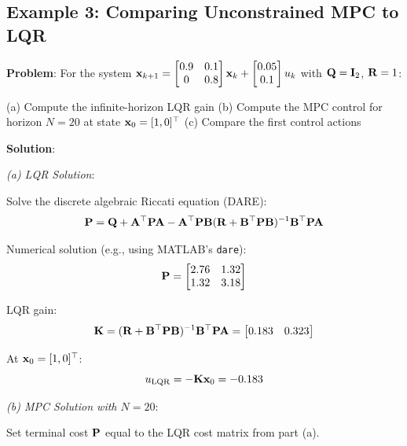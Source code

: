 \subsection{Example 3: Comparing Unconstrained MPC to LQR}

\textbf{Problem}: For the system $\mathbf{x}_{k+1} = \begin{bmatrix} 0.9 & 0.1 \\ 0 & 0.8 \end{bmatrix} \mathbf{x}_k + \begin{bmatrix} 0.05 \\ 0.1 \end{bmatrix} u_k$ with $\mathbf{Q} = \mathbf{I}_2$, $\mathbf{R} = 1$:

(a) Compute the infinite-horizon LQR gain
(b) Compute the MPC control for horizon $N=20$ at state $\mathbf{x}_0 = [1, 0]^\top$
(c) Compare the first control actions

\textbf{Solution}:

\textit{(a) LQR Solution}:

Solve the discrete algebraic Riccati equation (DARE):
\begin{equation}
    \mathbf{P} = \mathbf{Q} + \mathbf{A}^\top \mathbf{P} \mathbf{A} - \mathbf{A}^\top \mathbf{P} \mathbf{B} (\mathbf{R} + \mathbf{B}^\top \mathbf{P} \mathbf{B})^{-1} \mathbf{B}^\top \mathbf{P} \mathbf{A}
\end{equation}

Numerical solution (e.g., using MATLAB's \texttt{dare}):
\begin{equation}
    \mathbf{P} = \begin{bmatrix} 2.76 & 1.32 \\ 1.32 & 3.18 \end{bmatrix}
\end{equation}

LQR gain:
\begin{equation}
    \mathbf{K} = (\mathbf{R} + \mathbf{B}^\top \mathbf{P} \mathbf{B})^{-1} \mathbf{B}^\top \mathbf{P} \mathbf{A} = \begin{bmatrix} 0.183 & 0.323 \end{bmatrix}
\end{equation}

At $\mathbf{x}_0 = [1, 0]^\top$:
\begin{equation}
    u_{\text{LQR}} = -\mathbf{K} \mathbf{x}_0 = -0.183
\end{equation}

\textit{(b) MPC Solution with $N=20$}:

Set terminal cost $\mathbf{P}$ equal to the LQR cost matrix from part (a).

